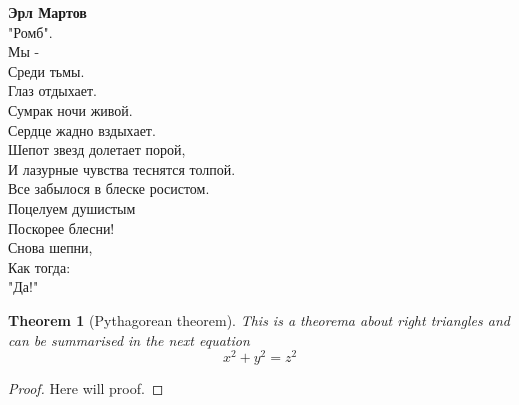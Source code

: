 \documentclass{article}
\newenvironment{myquotation}%
	{\begin{center}\begin{itshape}}%
	{\end{itshape}\end{center}}
\newtheorem{theorem}{Theorem}[section]
\begin{document}
	\begin{myquotation}
		{\bf Эрл Мартов}\\
		"Ромб".\\
		Мы -\\
		Среди тьмы.\\
		Глаз отдыхает.\\
		Сумрак ночи живой.\\
		Сердце жадно вздыхает.\\
		Шепот звезд долетает порой,\\
		И лазурные чувства теснятся толпой.\\
		Все забылося в блеске росистом.\\
		Поцелуем  душистым\\
		Поскорее блесни!\\
		Снова шепни,\\
		Как тогда:\\
		"Да!"
	\end{myquotation}
	
	\newpage
		
	\begin{theorem}[Pythagorean theorem]
		\label{pythagorean}
		This is a theorema about right triangles and can be summarised in the next 
equation 
		\[ x^2 + y^2 = z^2 \]
	\end{theorem}
	
	\begin{proof}
		Here will proof.
	\end{proof}
\end{document}
